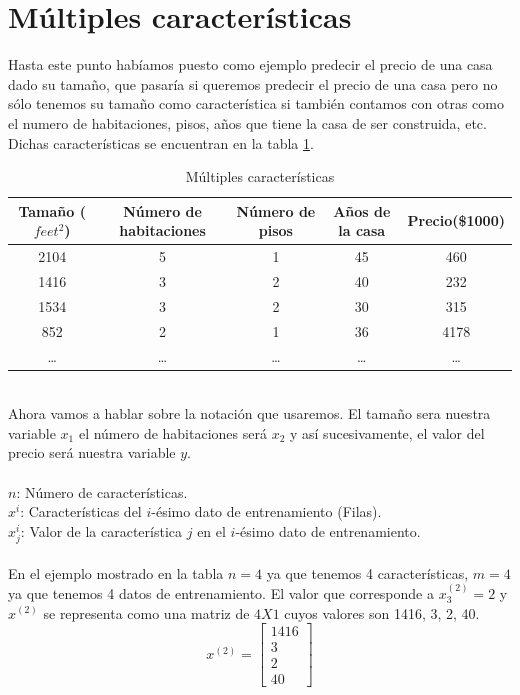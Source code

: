 \documentclass{report}
\begin{document}
\section{Múltiples características}
Hasta este punto habíamos puesto como ejemplo predecir el precio de una casa dado su tamaño, que pasaría si queremos predecir el precio de una casa pero no sólo tenemos su tamaño como característica si también contamos con otras como el numero de habitaciones, pisos, años que tiene la casa de ser construida, etc. Dichas características se encuentran en la tabla \ref{Tab:Multi}.
\begin{table}[h]
		\begin{tabular}{|c|c|c|c||c|}
			\hline
			Tamaño ($feet^2$) & Número de habitaciones & Número de pisos&Años de la casa&Precio(\$1000)\\
			\hline
			\hline
			2104&5&1&45&460\\
			1416&3&2&40&232\\
			1534&3&2&30&315\\
			852&2&1&36&4178\\
			\dots&\dots&\dots&\dots&\dots\\		
			\hline	
		\end{tabular}
	\caption{Múltiples características}
	\label{Tab:Multi}
\end{table}
\\Ahora vamos a hablar sobre la notación que usaremos. El tamaño sera nuestra variable $x_1$ el número de habitaciones será $x_2$ y así sucesivamente, el valor del precio será nuestra variable $y$.\\\\
\textbf{\textit{$n$}}: Número de características.\\
\textbf{\textit{$x^{i}$}}: Características del $i$-ésimo dato de entrenamiento (Filas).\\
\textbf{\textit{$x^{i}_j$}}: Valor de la característica $j$ en el $i$-ésimo dato de entrenamiento.\\\\
En el ejemplo mostrado en la tabla $n=4$ ya que tenemos 4 características, $m=4$ ya que tenemos 4 datos de entrenamiento. El valor que corresponde a $ x_3^{(2)}=2$ y $x^{(2)}$ se representa como una matriz de $4X1$ cuyos valores son 1416, 3, 2, 40.
\[x^{(2)}=\left[
\begin{array}{c}
	1416\\3\\2\\40
\end{array}
\right]
\]
\end{document}
